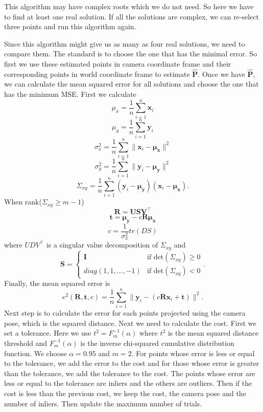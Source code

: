 \documentclass{../../assignment}
\begin{document}
\begin{problemlist}
\begin{enumerate}
This algorithm may have complex roots which we do not need. So here we have to find at least one real solution. If all the solutions are complex, we can re-select three points and run this algorithm again. 

Since this algorithm might give us as many as four real solutions, we need to compare them. The standard is to choose the one that has the minimal error. So first we use these estimated points in camera coordinate frame and their corresponding points in world coordinate frame to estimate $\hat{\mathbf{P}}$. Once we have $\hat{\mathbf{P}}$, we can calculate the mean squared error for all solutions and choose the one that has the minimum MSE.
First we calculate
$$\mu_x = \frac{1}{n} \sum_{i = 1}^n \mathbf{x}_i$$
$$\mu_y = \frac{1}{n} \sum_{i = 1}^n \mathbf{y}_i$$
$$\sigma_x^2 = \frac{1}{n} \sum_{i = 1}^n \|\mathbf{x}_i - \mathbf{\mu_x}\|^2$$
$$\sigma_y^2 = \frac{1}{n} \sum_{i = 1}^n \|\mathbf{y}_i - \mathbf{\mu_y}\|^2$$
$$\Sigma_{xy} = \frac{1}{n} \sum_{i = 1}^n (\mathbf{y}_i - \mathbf{\mu_y})(\mathbf{x}_i - \mathbf{\mu_x}).$$
When rank($\Sigma_{xy} \geqslant m-1$)
$$\mathbf{R = USV^{\top}}$$
$$\mathbf{t} = \mathbf{\mu_y} - c\mathbf{R\mu_x}$$
$$c = \frac{1}{\sigma_x^2}tr(DS)$$
where $UDV^{\top}$ is a singular value decomposition of $\Sigma_{xy}$ and
$$\mathbf{S} =
\begin{cases}
\mathbf{I}& \text{if det$(\Sigma_{xy}) \geqslant 0$}\\
diag(1,1,...,-1)& \text{if det$(\Sigma_{xy}) < 0$}
\end{cases}.$$
Finally, the mean squared error is
$$e^2(\mathbf{R},\mathbf{t},c) = \frac{1}{n} \sum_{i = 1}^n \| \mathbf{y}_i - (c\mathbf{Rx}_i + \mathbf{t}) \|^2.$$
Next step is to calculate the error for each points projected using the camera pose, which is the squared distance. 
Next we need to calculate the cost. First we set a tolerance. Here we use $t^2 = F_m^{-1}(\alpha)$ where $t^2$ is the mean squared distance threshold and $F_m^{-1}(\alpha)$ is the inverse chi-squared cumulative distribution function. We choose $\alpha = 0.95$ and $m = 2$. For points whose error is less or equal to the tolerance, we add the error to the cost and for those whose error is greater than the tolerance, we add the tolerance to the cost. The points whose error are less or equal to the tolerance are inliers and the others are outliers. Then if the cost is less than the previous cost, we keep the cost, the camera pose and the number of inliers. Then update the maximum number of trials.\\




\end{enumerate}
\end{problemlist}
\end{document}
